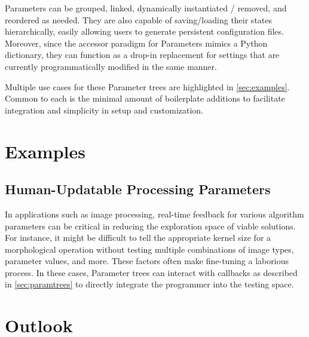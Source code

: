 \documentclass[journal]{vgtc}                %
\begin{document}
Parameters can be grouped, linked, dynamically instantiated / removed, and reordered as needed. They are also capable of saving/loading their states hierarchically, easily allowing users to generate persistent configuration files. Moreover, since the accessor paradigm for Parameters mimics a Python dictionary, they can function as a drop-in replacement for settings that are currently programmatically modified in the same manner.

Multiple use cases for these Parameter trees are highlighted in \autoref{sec:examples}. Common to each is the minimal amount of boilerplate additions to facilitate integration and simplicity in setup and customization.


\section{Examples}\label{sec:examples}

\subsection{Human-Updatable Processing Parameters}
In applications such as image processing, real-time feedback for various algorithm parameters can be critical in reducing the exploration space of viable solutions. For instance, it might be difficult to tell the appropriate kernel size for a morphological operation without testing multiple combinations of image types, parameter values, and more. These factors often make fine-tuning a laborious process. In these cases, Parameter trees can interact with callbacks as described in \autoref{sec:paramtrees} to directly integrate the programmer into the testing space.

\section{Outlook}
\end{document}
